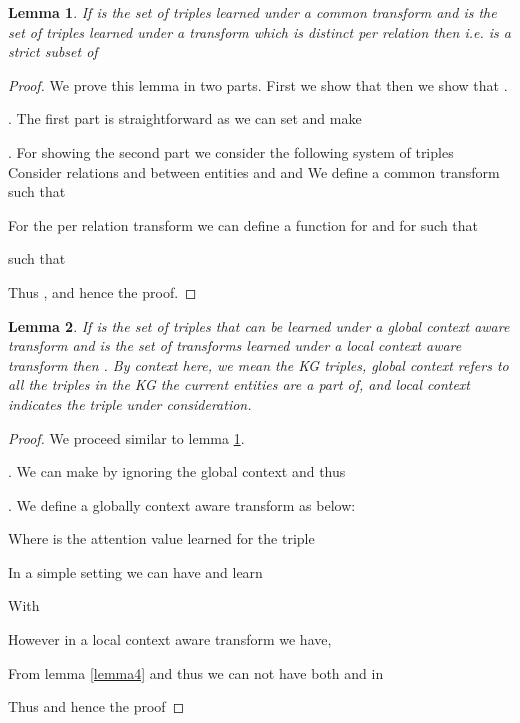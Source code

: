 \documentclass[sigconf]{acmart}
\newtheorem{lemma}{Lemma}[section]
\begin{document}
\begin{lemma}\label{lemma5}
If  is the set of triples learned under a common transform  and  is the set of triples learned under a transform  which is distinct per relation then  i.e.  is a strict subset of 
\end{lemma}
\begin{proof}
We prove this lemma in two parts.
First we show that  then we show that .
\par {}. The first part is straightforward as we can set  and make 
\par {}. For showing the second part we consider the following system of triples
Consider relations  and  between entities  and  and 
We define a common transform  such that
 


	
\par \noindent For the per relation transform we can define a function  for  and  for  such that  

such that 
\par \noindent Thus , and hence the proof.
\end{proof}

\begin{lemma}\label{lemma6}
If  is the set of triples that can be learned under a global context aware transform  and  is the set of transforms learned under a local context aware transform then .
By context here, we mean the KG triples, global context refers to all the triples in the KG the current entities are a part of, and local context indicates the triple under consideration.
\end{lemma}
\begin{proof}
We proceed similar to lemma \ref{lemma5}.
\par {}. We can make  by ignoring the global context and thus 
\par {}. We define a globally context aware transform as below:


Where  is the attention value learned for the triple 
\par \noindent In a simple setting we can have  and learn 

With 
\par \noindent However in a local context aware transform  we have,


From lemma \ref{lemma4}  and thus we can not have both  and  in 
\par \noindent Thus  and hence the proof
\end{proof}
\end{document}
